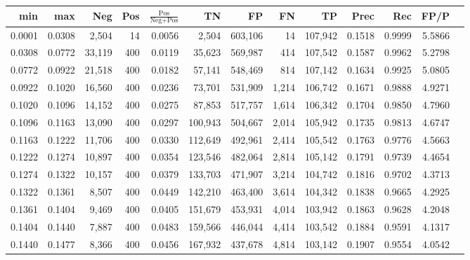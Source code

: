 \begin{tabular}{rrrrrrrrrrrrr}
\toprule
   min &    max &    Neg &   Pos & $\frac{\text{Pos}}{\text{Neg}+\text{Pos}}$ &      TN &      FP &      FN &      TP &   Prec &    Rec &   FP/P \\
\midrule
0.0001 & 0.0308 &  2,504 &    14 &                                     0.0056 &   2,504 & 603,106 &      14 & 107,942 & 0.1518 & 0.9999 & 5.5866 \\
0.0308 & 0.0772 & 33,119 &   400 &                                     0.0119 &  35,623 & 569,987 &     414 & 107,542 & 0.1587 & 0.9962 & 5.2798 \\
0.0772 & 0.0922 & 21,518 &   400 &                                     0.0182 &  57,141 & 548,469 &     814 & 107,142 & 0.1634 & 0.9925 & 5.0805 \\
0.0922 & 0.1020 & 16,560 &   400 &                                     0.0236 &  73,701 & 531,909 &   1,214 & 106,742 & 0.1671 & 0.9888 & 4.9271 \\
0.1020 & 0.1096 & 14,152 &   400 &                                     0.0275 &  87,853 & 517,757 &   1,614 & 106,342 & 0.1704 & 0.9850 & 4.7960 \\
0.1096 & 0.1163 & 13,090 &   400 &                                     0.0297 & 100,943 & 504,667 &   2,014 & 105,942 & 0.1735 & 0.9813 & 4.6747 \\
0.1163 & 0.1222 & 11,706 &   400 &                                     0.0330 & 112,649 & 492,961 &   2,414 & 105,542 & 0.1763 & 0.9776 & 4.5663 \\
0.1222 & 0.1274 & 10,897 &   400 &                                     0.0354 & 123,546 & 482,064 &   2,814 & 105,142 & 0.1791 & 0.9739 & 4.4654 \\
0.1274 & 0.1322 & 10,157 &   400 &                                     0.0379 & 133,703 & 471,907 &   3,214 & 104,742 & 0.1816 & 0.9702 & 4.3713 \\
0.1322 & 0.1361 &  8,507 &   400 &                                     0.0449 & 142,210 & 463,400 &   3,614 & 104,342 & 0.1838 & 0.9665 & 4.2925 \\
0.1361 & 0.1404 &  9,469 &   400 &                                     0.0405 & 151,679 & 453,931 &   4,014 & 103,942 & 0.1863 & 0.9628 & 4.2048 \\
0.1404 & 0.1440 &  7,887 &   400 &                                     0.0483 & 159,566 & 446,044 &   4,414 & 103,542 & 0.1884 & 0.9591 & 4.1317 \\
0.1440 & 0.1477 &  8,366 &   400 &                                     0.0456 & 167,932 & 437,678 &   4,814 & 103,142 & 0.1907 & 0.9554 & 4.0542 \\

\end{tabular}
